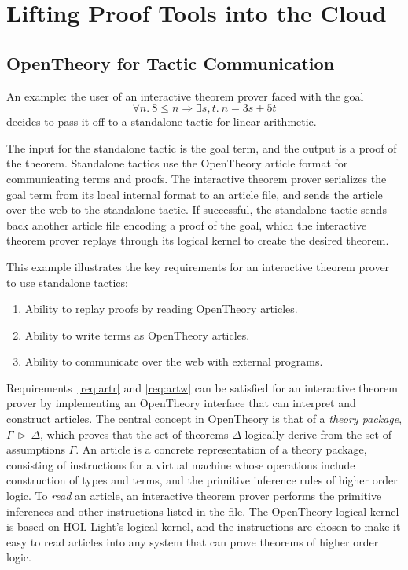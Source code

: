\documentclass{llncs}
\newcommand{\OpenTheory}{OpenTheory\xspace}
\newcommand{\theory}[2]{{#1}\,\triangleright\,{#2}}
\begin{document}
\section{Lifting Proof Tools into the Cloud}
\label{sec:implementation}

\subsection{\OpenTheory for Tactic Communication}

An example: the user of an interactive theorem prover faced with the goal
\[
\forall n.\ 8\le n\Rightarrow\exists s,t.\ n = 3s + 5t
\]
decides to pass it off to a standalone tactic for linear arithmetic.

The input for the standalone tactic is the goal term, and the output is a proof of the theorem.
Standalone tactics use the \OpenTheory article format for communicating terms and proofs.
The interactive theorem prover serializes the goal term from its local internal format to an article file, and sends the article over the web to the standalone tactic.
If successful, the standalone tactic sends back another article file encoding a proof of the goal, which the interactive theorem prover replays through its logical kernel to create the desired theorem.

This example illustrates the key requirements for an interactive theorem prover to use standalone tactics:
\begin{enumerate}
\item\label{req:artr} Ability to replay proofs by reading \OpenTheory articles.

\item\label{req:artw} Ability to write terms as \OpenTheory articles.

\item\label{req:comm} Ability to communicate over the web with external programs.
\end{enumerate}

Requirements~\ref{req:artr} and \ref{req:artw} can be satisfied for an interactive theorem prover by implementing an \OpenTheory interface that can interpret and construct articles.
The central concept in \OpenTheory is that of a \emph{theory package}, $\theory{\Gamma}{\Delta}$, which proves that the set of theorems $\Delta$ logically derive from the set of assumptions $\Gamma$.
An article is a concrete representation of a theory package, consisting of instructions for a virtual machine whose operations include construction of types and terms, and the primitive inference rules of higher order logic.
To \emph{read} an article, an interactive theorem prover performs the primitive inferences and other instructions listed in the file.
The \OpenTheory logical kernel is based on HOL Light's logical kernel, and the instructions are chosen to make it easy to read articles into any system that can prove theorems of higher order logic.
\end{document}
